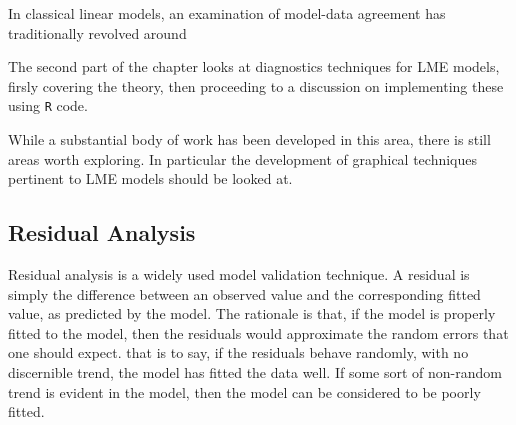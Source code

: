 \documentclass[12pt, a4paper]{report}
\theoremstyle{plain}
\theoremstyle{definition}
\theoremstyle{remark}
\begin{document}
In classical linear models, an examination of model-data agreement has traditionally revolved around

The second part of the chapter looks at diagnostics techniques for LME models, firsly covering the theory, then proceeding to a discussion on 
implementing these using \texttt{R} code.

While a substantial body of work has been developed in this area, there is still areas worth exploring. 
In particular the development of graphical techniques pertinent to LME models should be looked at.




%
%
%
%










\newpage
\subsection{Residual Analysis}

Residual analysis is a widely used model validation technique. A residual is simply the difference between an observed value and the corresponding fitted value, as predicted by the model. The rationale is that, if the model is properly fitted to the model, then the residuals would approximate the random errors that one should expect.
that is to say, if the residuals behave randomly, with no discernible trend, the model has fitted the data well. If some sort of non-random trend is evident in the model, then the model can be considered to be poorly fitted.
\end{document}
